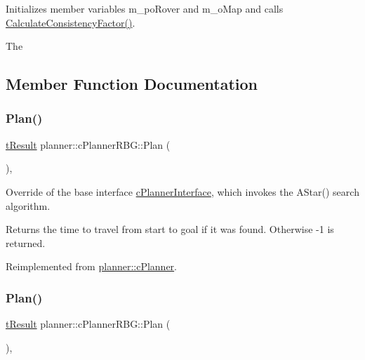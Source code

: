 Initializes member variables m\+\_\+po\+Rover and m\+\_\+o\+Map and calls \mbox{\hyperlink{classplanner_1_1c_planner_a2e5a745f83f903662eff914d8beddb5e}{Calculate\+Consistency\+Factor()}}. 

The 

\subsection{Member Function Documentation}
\mbox{\label{classplanner_1_1c_planner_r_b_g_a0bbd752702da582a47dbd153c0065eb5}} 
\subsubsection{\texorpdfstring{Plan()}{Plan()}\hspace{0.1cm}{\footnotesize\ttfamily [1/2]}}
{\footnotesize\ttfamily \mbox{\hyperlink{structt_result}{t\+Result}} planner\+::c\+Planner\+R\+B\+G\+::\+Plan (\begin{DoxyParamCaption}{ }\end{DoxyParamCaption})\hspace{0.3cm}{\ttfamily [override]}, {\ttfamily [virtual]}}



Override of the base interface \mbox{\hyperlink{classplanner_1_1c_planner_interface}{c\+Planner\+Interface}}, which invokes the A\+Star() search algorithm. 

\begin{DoxyReturn}{Returns}
the time to travel from start to goal if it was found. Otherwise -\/1 is returned. 
\end{DoxyReturn}


Reimplemented from \mbox{\hyperlink{classplanner_1_1c_planner_a21230c015260b9fc34ad2f239592470e}{planner\+::c\+Planner}}.

\mbox{\label{classplanner_1_1c_planner_r_b_g_a0bbd752702da582a47dbd153c0065eb5}} 
\subsubsection{\texorpdfstring{Plan()}{Plan()}\hspace{0.1cm}{\footnotesize\ttfamily [2/2]}}
{\footnotesize\ttfamily \mbox{\hyperlink{structt_result}{t\+Result}} planner\+::c\+Planner\+R\+B\+G\+::\+Plan (\begin{DoxyParamCaption}{ }\end{DoxyParamCaption})\hspace{0.3cm}{\ttfamily [override]}, {\ttfamily [virtual]}}



